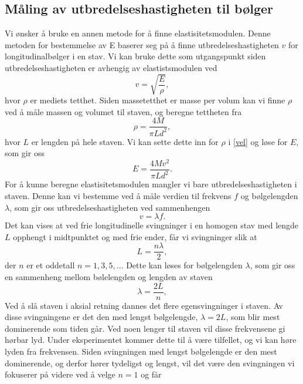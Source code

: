 \documentclass[%
 reprint,
 amsmath,amssymb,
 aps,
]{revtex4-1}
\begin{document}
\subsection{Måling av utbredelseshastigheten til bølger}
Vi ønsker å bruke en annen metode for å finne elastisitetsmodulen. Denne metoden for bestemmelse av E baserer seg på å finne utbredelseshastigheten $v$ for longitudinalbølger i en stav. Vi kan bruke dette som utgangspunkt siden utbredelseshastigheten er avhengig av elastistsmodulen ved
\begin{equation}
  v = \sqrt{\frac{E}{\rho}},\label{vel}
\end{equation}
hvor $\rho$ er mediets tetthet. Siden massetetthet er masse per volum kan vi finne $\rho$ ved å måle massen og volumet til staven, og beregne tettheten fra
\begin{equation*}
  \rho = \frac{4M}{\pi L d^2},
\end{equation*}
hvor $L$ er lengden på hele staven. Vi kan sette dette inn for $\rho$ i \eqref{vel} og løse for $E$, som gir oss
\begin{equation}
  E = \frac{4Mv^2}{\pi L d^2}.\label{elast}
\end{equation}
For å kunne beregne elastisitetsmodulen mangler vi bare utbredelseshastigheten i staven. Denne kan vi bestemme ved å måle verdien til frekvens $f$ og bølgelengden $\lambda$, som gir oss utbredelseshastigheten ved sammenhengen
\begin{equation}
  v = \lambda f.\label{vlf}
\end{equation}
Det kan vises at ved frie longitudinelle svingninger i en homogen stav med lengde $L$ opphengt i midtpunktet og med frie ender, får vi svingninger slik at
\begin{equation*}
  L = \frac{n\lambda}{2},
\end{equation*}
der $n$ er et oddetall $n = 1, 3, 5, \ldots$ Dette kan løses for bølgelengden $\lambda$, som gir oss en sammenheng mellom bølelengden og lengden av staven
\begin{equation*}
  \lambda = \frac{2L}{n},
\end{equation*}
Ved å slå staven i aksial retning dannes det flere egensvingninger i staven. Av disse svingningene er det den med lengst bølgelengde, $\lambda = 2L$, som blir mest dominerende som tiden går. Ved noen lenger til staven vil disse frekvensene gi hørbar lyd. Under eksperimentet kommer dette til å være tilfellet, og vi kan høre lyden fra frekvensen. Siden svingningen med lengst bølgelengde er den mest dominerende, og derfor hører tydeligst og lengst, vil det være den svingningen vi fokuserer på videre ved å velge $n=1$ og får
\end{document}
